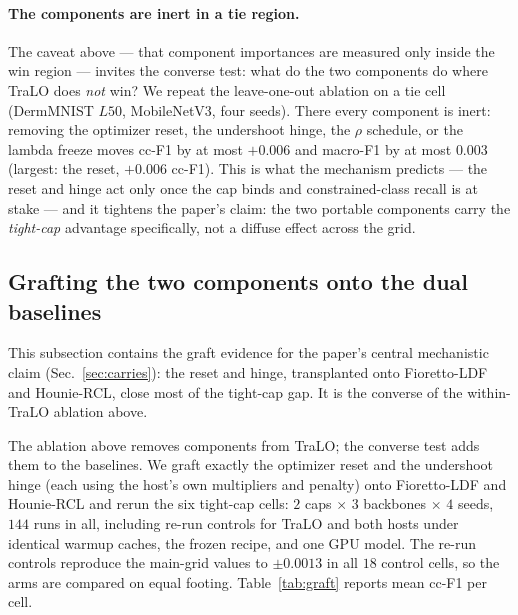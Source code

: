 \documentclass[10pt]{article}
\begin{document}
{\color{blue}
\paragraph{The components are inert in a tie region.}
The caveat above --- that component importances are measured only inside the win
region --- invites the converse test: what do the two components do where TraLO does
\emph{not} win? We repeat the leave-one-out ablation on a tie cell (DermMNIST $L50$,
MobileNetV3, four seeds). There every component is inert: removing the optimizer
reset, the undershoot hinge, the $\rho$ schedule, or the lambda freeze moves cc-F1 by
at most $+0.006$ and macro-F1 by at most $0.003$ (largest: the reset, $+0.006$ cc-F1).
This is what the mechanism predicts --- the reset and hinge act only once the cap binds
and constrained-class recall is at stake --- and it tightens the paper's claim: the two
portable components carry the \emph{tight-cap} advantage specifically, not a diffuse
effect across the grid.}



\subsection{Grafting the two components onto the dual baselines}
\label{app:graft}

This subsection contains the graft evidence for the paper's central
mechanistic claim (Sec.~\ref{sec:carries}): the reset and hinge,
transplanted onto Fioretto-LDF and Hounie-RCL, close most of the
tight-cap gap. It is the converse of the within-TraLO ablation above.

The ablation above removes components from TraLO; the converse test adds
them to the baselines. We graft exactly the optimizer reset and the
undershoot hinge (each using the host's own multipliers and penalty)
onto Fioretto-LDF and Hounie-RCL and rerun the six tight-cap cells:
$2$ caps $\times$ $3$ backbones $\times$ $4$ seeds, $144$ runs in all,
including re-run controls for TraLO and both hosts under identical
warmup caches, the frozen recipe, and one GPU model. The re-run
controls reproduce the main-grid values to $\pm0.0013$ in all $18$
control cells, so the arms are compared on equal footing.
Table~\ref{tab:graft} reports mean cc-F1 per cell.
\end{document}
